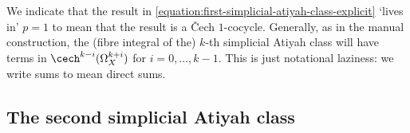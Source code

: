         \begin{note}
            We indicate that the result in \cref{equation:first-simplicial-atiyah-class-explicit} `lives in' $p=1$ to mean that the result is a Čech $1$-cocycle.
            Generally, as in the manual construction, the (fibre integral of the) $k$-th simplicial Atiyah class will have terms in $\cech^{k-i}(\Omega_X^{k+i})$ for $i=0,\ldots,k-1$.
            This is just notational laziness: we write sums to mean direct sums.
        \end{note}


    \subsection{The second simplicial Atiyah class} %
    \label{sub:the_second_simplicial_atiyah_class}

